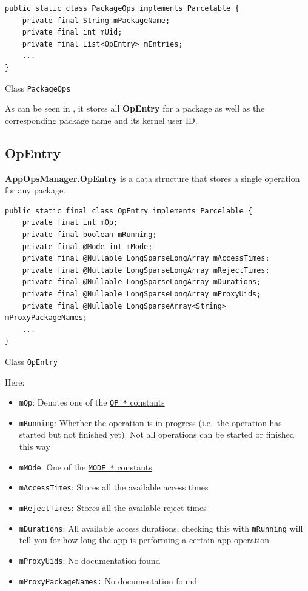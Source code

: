 \begin{listing}[H]
    \begin{verbatim}
public static class PackageOps implements Parcelable {
    private final String mPackageName;
    private final int mUid;
    private final List<OpEntry> mEntries;
    ...
}
    \end{verbatim}
    \caption{Class \texttt{PackageOps}}
    \label{lst:package-ops-class}
\end{listing}

As can be seen in , it stores all \textbf{OpEntry} for a package as well as the
corresponding package name and its kernel user ID\@.

\subsection{OpEntry}\label{subsec:opentry}
\textbf{AppOpsManager.OpEntry} is a data structure that stores a single operation for any package.

\begin{listing}[H]
    \begin{verbatim}
public static final class OpEntry implements Parcelable {
    private final int mOp;
    private final boolean mRunning;
    private final @Mode int mMode;
    private final @Nullable LongSparseLongArray mAccessTimes;
    private final @Nullable LongSparseLongArray mRejectTimes;
    private final @Nullable LongSparseLongArray mDurations;
    private final @Nullable LongSparseLongArray mProxyUids;
    private final @Nullable LongSparseArray<String> mProxyPackageNames;
    ...
}
    \end{verbatim}
    \caption{Class \texttt{OpEntry}}
    \label{lst:class-op-entry}
\end{listing}
Here:
\begin{itemize}
    \item \texttt{mOp}: Denotes one of the \hyperref[subsec:op-constants]{\texttt{OP\_*} constants}
    \item \texttt{mRunning}: Whether the operation is in progress (i.e.\ the operation has started but not finished
    yet). Not all operations can be started or finished this way
    \item \texttt{mMOde}: One of the \hyperref[subsec:mode-constants]{\texttt{MODE\_*} constants}
    \item \texttt{mAccessTimes}: Stores all the available access times
    \item \texttt{mRejectTimes}: Stores all the available reject times
    \item \texttt{mDurations}: All available access durations, checking this with \texttt{mRunning} will tell you for
    how long the app is performing a certain app operation
    \item \texttt{mProxyUids}: No documentation found
    \item \texttt{mProxyPackageNames:} No documentation found
\end{itemize}

